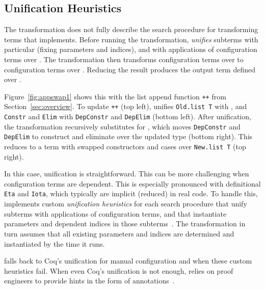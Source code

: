 \subsection{Unification Heuristics}
\label{sec:trans-unification}

The transformation does not fully describe the search procedure for transforming terms that \toolnamec implements.
Before running the transformation, \toolnamec \textit{unifies} subterms with particular \Aa (fixing parameters and indices),
and with applications of configuration terms over \Aa. 
The transformation then transforms configuration terms over \Aa
to configuration terms over \B.
Reducing the result produces the output term defined over \B.

Figure~\ref{fig:appswap1} shows this with the list append function \lstinline{++} from Section~\ref{sec:overview}.
To update \lstinline{++} (top left), \toolnamec unifies \lstinline{Old.list T} with \Aa, and \lstinline{Constr} and \lstinline{Elim}
with \lstinline{DepConstr} and \lstinline{DepElim} (bottom left).
After unification, the transformation recursively substitutes \B
for \Aa, which moves \lstinline{DepConstr} and \lstinline{DepElim}
to construct and eliminate over the updated type (bottom right).
This reduces to a term with swapped constructors and cases over \lstinline{New.list T} (top right).

In this case, unification is straightforward.
This can be more challenging when configuration terms are dependent.
This is especially pronounced with definitional \lstinline{Eta} and \lstinline{Iota},
which typically are implicit (reduced) in real code.
To handle this, \toolnamec implements custom \textit{unification heuristics} for each search procedure
that unify subterms with applications of configuration terms, and that instantiate parameters and dependent indices in those subterms~\href{https://github.com/uwplse/pumpkin-pi/blob/v2.0.0/plugin/src/automation/lift/liftconfig.ml}{}. %
The transformation in turn assumes that all existing parameters and indices are determined and instantiated
by the time it runs.

\toolnamec falls back to Coq's unification for manual configuration and when these custom heuristics fail.
When even Coq's unification is not enough, \toolnamec relies on proof engineers to provide hints
in the form of annotations~\href{https://github.com/uwplse/pumpkin-pi/blob/v2.0.0/plugin/coq/nonorn.v}{}.

